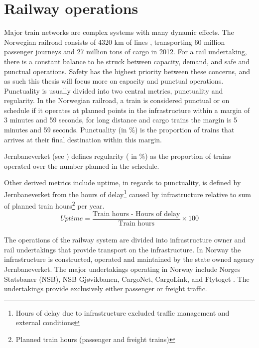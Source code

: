 
\section{Railway operations} %
\label{sec:railway_operations}
Major train networks are complex systems with many dynamic effects. The 
Norwegian railroad consists of 4320 km of lines \cite[p. 4]{jernbaneverketStatistikk}, transporting 60 million passenger journeys and 27 
million tons of cargo in 2012\cite[p. 9]{jernbaneverketStatistikk}. For a rail 
undertaking, there is a constant balance to be struck between capacity, demand, 
and safe and punctual operations. Safety has the highest priority between 
these concerns, and as such this thesis will focus more on capacity and 
punctual operations.\\

Punctuality is usually divided into two central metrics, punctuality and 
regularity. In the Norwegian railroad, a train is considered punctual or on 
schedule if it operates at planned points in the infrastructure within a 
margin of 3 minutes and 59 seconds, for long distance and cargo trains the 
margin is 5 minutes and 59 seconds. Punctuality (in \%) is the proportion of 
trains that arrives at their final destination within this margin.

Jernbaneverket (see ) defines regularity (
in \%) as the proportion of trains operated over the number planned in the 
schedule. 

Other derived metrics include uptime, in regards to punctuality, is defined by 
Jernbaneverket from 
the hours of delay\footnote{Hours of delay due to infrastructure excluded 
traffic	management and external conditions} caused by infrastructure relative 
to sum of planned train hours\footnote{Planned train hours (passenger and 
freight trains)} per year.\cite{jernbaneverketPunklighetsTall}
\begin{equation} \label{eq:uptime}
		Uptime =
		\frac
				{
					\text{Train hours - Hours of delay}
				}
				{
					\text{Train hours}
				}\times 100 
\end{equation}\\

The operations of the railway system are divided into infrastructure owner and 
rail undertakings that provide transport on the infrastructure. In Norway the 
infrastructure is constructed, operated and maintained by the state owned 
agency Jernbaneverket. The major undertakings operating in Norway  include 
Norges Statsbaner (NSB), NSB Gjøvikbanen, CargoNet, CargoLink, and Flytoget \cite{ wiki:NorwegianRailway}. The undertakings provide exclusively either passenger 
or freight traffic.\\

